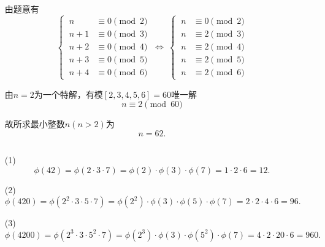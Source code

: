 \documentclass[UTF8]{ctexart}
\begin{document}
\subsection{}   %
\begin{enumerate}
    \item []由题意有
    \[
        \begin{cases}
            \ n   &\equiv 0 \pmod 2\\
            \ n+1 &\equiv 0 \pmod 3\\
            \ n+2 &\equiv 0 \pmod 4\\
            \ n+3 &\equiv 0 \pmod 5\\
            \ n+4 &\equiv 0 \pmod 6
        \end{cases}
        \ \Leftrightarrow\ 
        \begin{cases}
            \ n &\equiv 0 \pmod 2\\
            \ n &\equiv 2 \pmod 3\\
            \ n &\equiv 2 \pmod 4\\
            \ n &\equiv 2 \pmod 5\\
            \ n &\equiv 2 \pmod 6
        \end{cases}
    \]
    \item []由$n=2$为一个特解，有模$[2,3,4,5,6]=60$唯一解
    \[
        n \equiv 2 \pmod {60}
    \]
    \item []故所求最小整数$n(n>2)$为
    \[
        n=62.
    \]
\end{enumerate}

\subsection{}   %
\begin{enumerate}
    \item [(1)]
    \[
       \phi (42) 
       = \phi (2 \cdot 3 \cdot 7) 
       = \phi (2) \cdot \phi (3) \cdot \phi (7)
       = 1\cdot 2 \cdot 6
       = 12.
    \]
    \item [(2)]
    \[
        \phi (420) 
       = \phi (2^2 \cdot 3 \cdot 5 \cdot 7) 
       = \phi (2^2) \cdot \phi (3) \cdot \phi (5) \cdot \phi (7)
       = 2\cdot 2 \cdot 4\cdot 6
       = 96.
    \]
    \item [(3)]
    \[
        \phi (4200) 
       = \phi (2^3 \cdot 3 \cdot 5^2 \cdot 7) 
       = \phi (2^3) \cdot \phi (3) \cdot \phi (5^2) \cdot \phi (7)
       = 4\cdot 2 \cdot 20\cdot 6
       = 960.
    \]
\end{enumerate}
\end{document}
